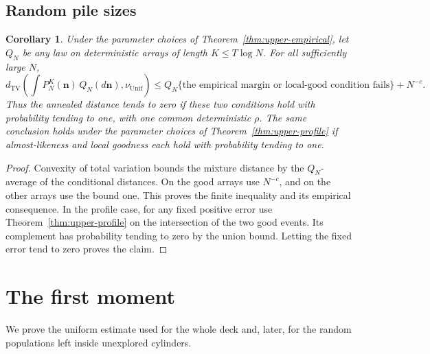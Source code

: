 \documentclass[11pt]{article}
\numberwithin{equation}{section}
\newtheorem{corollary}[theorem]{Corollary}
\theoremstyle{definition}
\theoremstyle{remark}
\newcommand{\TV}{\mathrm{TV}}
\newcommand{\Unif}{\mathrm{Unif}}
\newcommand{\dTV}{d_{\TV}}
\newcommand{\nuUnif}{\nu_{\Unif}}
\newcommand{\1}{\mathbf 1}
\begin{document}
\subsection{Random pile sizes}
\begin{corollary}%
\label{cor:upper-random}
Under the parameter choices of Theorem~\ref{thm:upper-empirical}, let
$Q_N$ be any law on deterministic arrays of length $K\le T\log N$.
For all sufficiently large $N$,
\[
 \dTV\left(\int P_N^K(\mathbf n)\,Q_N(d\mathbf n),
                         \nuUnif\right)
 \le Q_N\{\text{the empirical margin or local-good condition fails}\}
                        +N^{-c}.
\]
Thus the annealed distance tends to zero if these two conditions hold
with probability tending to one, with one common deterministic $\rho$.
The same conclusion holds under the parameter choices of
Theorem~\ref{thm:upper-profile} if almost-likeness and local goodness
each hold with probability tending to one.
\end{corollary}
\begin{proof}
Convexity of total variation bounds the mixture distance by the
$Q_N$-average of the conditional distances. On the good arrays use
$N^{-c}$, and on the other arrays use the bound one. This proves the
finite inequality and its empirical consequence. In the profile
case, for any fixed positive error use
Theorem~\ref{thm:upper-profile} on the intersection of the two good
events. Its complement has probability tending to zero by the union
bound. Letting the fixed error tend to zero proves the claim.
\end{proof}

\section{The first moment}\label{sec:upper-first}
We prove the uniform estimate used for the whole deck and, later, for
the random populations left inside unexplored cylinders.
\end{document}
